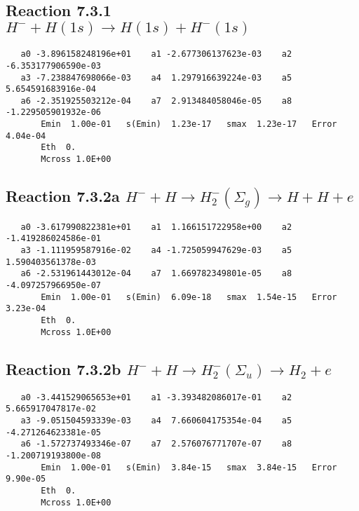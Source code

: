 \documentclass[12pt,dvipdfmx]{article}
\begin{document}
\newpage
\subsection{
Reaction 7.3.1 $   H^- + H(1s) \rightarrow H(1s) + H^-(1s)$}


\begin{small}\begin{verbatim}
   a0 -3.896158248196e+01    a1 -2.677306137623e-03    a2 -6.353177906590e-03
   a3 -7.238847698066e-03    a4  1.297916639224e-03    a5  5.654591683916e-04
   a6 -2.351925503212e-04    a7  2.913484058046e-05    a8 -1.229505901932e-06
       Emin  1.00e-01   s(Emin)  1.23e-17   smax  1.23e-17   Error  4.04e-04
       Eth  0.
       Mcross 1.0E+00
\end{verbatim}\end{small}

\newpage
\subsection{
Reaction 7.3.2a $   H^- + H \rightarrow H_2^-(\Sigma_g) \rightarrow H + H + e$}


\begin{small}\begin{verbatim}
   a0 -3.617990822381e+01    a1  1.166151722958e+00    a2 -1.419286024586e-01
   a3 -1.111959587916e-02    a4 -1.725059947629e-03    a5  1.590403561378e-03
   a6 -2.531961443012e-04    a7  1.669782349801e-05    a8 -4.097257966950e-07
       Emin  1.00e-01   s(Emin)  6.09e-18   smax  1.54e-15   Error  3.23e-04
       Eth  0.
       Mcross 1.0E+00
\end{verbatim}\end{small}

\newpage
\subsection{
Reaction 7.3.2b $   H^- + H \rightarrow H_2^-(\Sigma_u) \rightarrow H_2 + e$}


\begin{small}\begin{verbatim}
   a0 -3.441529065653e+01    a1 -3.393482086017e-01    a2  5.665917047817e-02
   a3 -9.051504593339e-03    a4  7.660604175354e-04    a5 -4.271264623381e-05
   a6 -1.572737493346e-07    a7  2.576076771707e-07    a8 -1.200719193800e-08
       Emin  1.00e-01   s(Emin)  3.84e-15   smax  3.84e-15   Error  9.90e-05
       Eth  0.
       Mcross 1.0E+00
\end{verbatim}\end{small}
\end{document}
